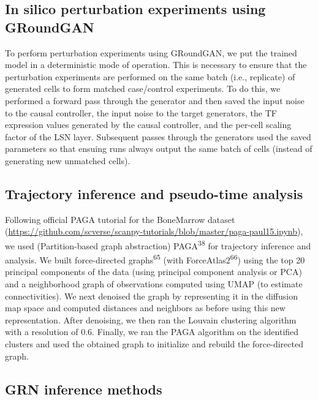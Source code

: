 \subsection*{In silico perturbation experiments using GRoundGAN}

To perform perturbation experiments using GRoundGAN, we put the trained model in a deterministic mode of operation. This is necessary to ensure that the perturbation experiments are performed on the same batch (i.e., replicate) of generated cells to form matched case/control experiments. To do this, we performed a forward pass through the generator and then saved the input noise to the causal controller, the input noise to the target generators, the TF expression values generated by the causal controller, and the per-cell scaling factor of the LSN layer. Subsequent passes through the generators used the saved parameters so that ensuing runs always output the same batch of cells (instead of generating new unmatched cells).

\subsection*{Trajectory inference and pseudo-time analysis}

Following official PAGA tutorial for the BoneMarrow dataset (\url{https://github.com/scverse/scanpy-tutorials/blob/master/paga-paul15.ipynb}), we used (Partition-based graph abstraction) PAGA\textsuperscript{38} for trajectory inference and analysis. We built force-directed graphs\textsuperscript{65} (with ForceAtlas2\textsuperscript{66}) using the top 20 principal components of the data (using principal component analysis or PCA) and a neighborhood graph of observations computed using UMAP (to estimate connectivities). We next denoised the graph by representing it in the diffusion map space and computed distances and neighbors as before using this new representation. After denoising, we then ran the Louvain clustering algorithm with a resolution of 0.6. Finally, we ran the PAGA algorithm on the identified clusters and used the obtained graph to initialize and rebuild the force-directed graph.

\subsection*{GRN inference methods}

